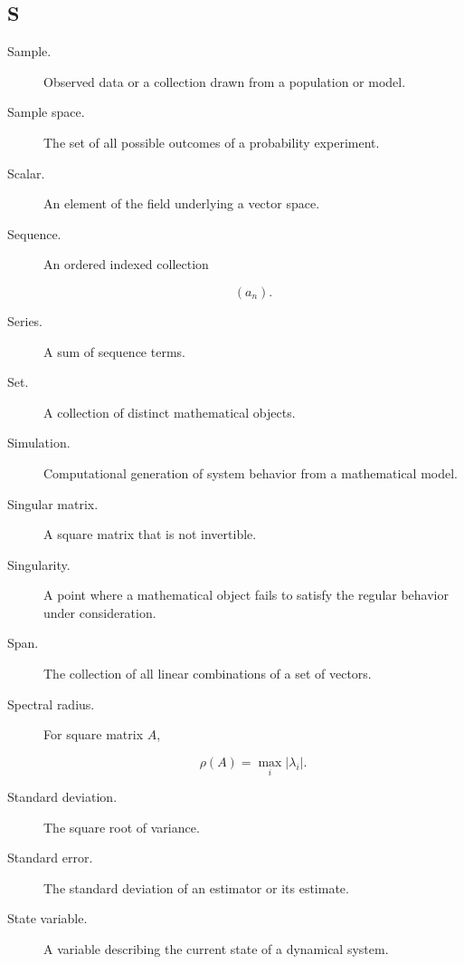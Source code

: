 \subsection*{S}

\begin{description}

\item[Sample.]
Observed data or a collection drawn from a population or model.

\item[Sample space.]
The set of all possible outcomes of a probability experiment.

\item[Scalar.]
An element of the field underlying a vector space.

\item[Sequence.]
An ordered indexed collection

\[
(a_n).
\]

\item[Series.]
A sum of sequence terms.

\item[Set.]
A collection of distinct mathematical objects.

\item[Simulation.]
Computational generation of system behavior from a mathematical model.

\item[Singular matrix.]
A square matrix that is not invertible.

\item[Singularity.]
A point where a mathematical object fails to satisfy the regular behavior
under consideration.

\item[Span.]
The collection of all linear combinations of a set of vectors.

\item[Spectral radius.]
For square matrix \(A\),

\[
\rho(A)
=
\max_i|\lambda_i|.
\]

\item[Standard deviation.]
The square root of variance.

\item[Standard error.]
The standard deviation of an estimator or its estimate.

\item[State variable.]
A variable describing the current state of a dynamical system.


\end{description}
